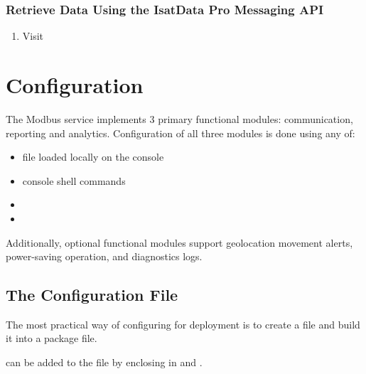 \documentclass[letterpaper,10pt,english]{sphinxmanual}
\begin{document}
\subsubsection{Retrieve Data Using the IsatData Pro Messaging API}
\label{\detokenize{usage:retrieve-data-using-the-isatdata-pro-messaging-api}}\begin{enumerate}
\item {} 
Visit 

\end{enumerate}


\section{Configuration}
\label{\detokenize{configuration:configuration}}\label{\detokenize{configuration::doc}}
The Modbus service implements 3 primary functional modules: communication, reporting and analytics.  Configuration of all three modules is done using any of:
\begin{itemize}
\item {} 
 file loaded locally on the console

\item {} 
console shell commands

\item {} 

\item {} 

\end{itemize}

Additionally, optional functional modules support geolocation movement alerts, power-saving operation, and diagnostics logs.


\subsection{The Configuration File}
\label{\detokenize{configuration:the-configuration-file}}\label{\detokenize{configuration:configfile}}
The most practical way of configuring for deployment is to create a  file and build it into a  package file.

 can be added to the  file by enclosing in \sphinxcode{\sphinxupquote{/*}} and \sphinxcode{\sphinxupquote{*/}}.
\end{document}
